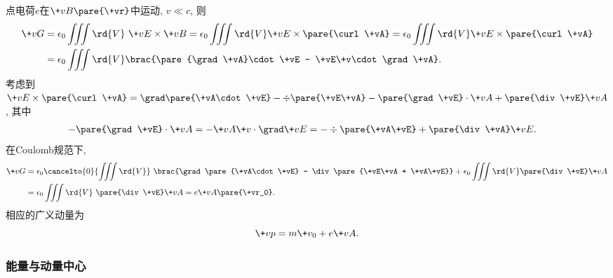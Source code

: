 \documentclass[hidelinks]{ctexart}
\begin{document}
\begin{sample}
    \begin{ex}
        点电荷$e$在$\+vB\pare{\+vr}$中运动, $v \ll c$, 则
        \begin{align*}
            \+vG &= \epsilon_0 \iiint \rd{V}\ \+vE\times \+vB = \epsilon_0 \iiint \rd{V} \+vE\times \pare{\curl \+vA} = \epsilon_0 \iiint \rd{V} \+vE\times \pare{\curl \+vA} \\
            &= \epsilon_0 \iiint \rd{V}\brac{\pare{\grad \+vA}\cdot \+vE - \+vE\+v\cdot \grad \+vA}.
        \end{align*}
        考虑到$\+vE\times \pare{\curl \+vA} = \grad\pare{\+vA\cdot \+vE} - \div\pare{\+vE\+vA} - \pare{\grad \+vE}\cdot \+vA + \pare{\div \+vE}\+vA$, 其中
        \begin{align*}
            -\pare{\grad \+vE}\cdot \+vA &=  -\+vA\+v\cdot \grad \+vE = -\div\pare{\+vA\+vE} + \pare{\div \+vA} \+vE.
        \end{align*}
        在Coulomb规范下,
        \begin{align*}
            \+vG &= \epsilon_0 \cancelto{0}{\iiint \rd{V}}\ \brac{\grad\pare{\+vA\cdot \+vE} - \div\pare{\+vE\+vA + \+vA\+vE}} + \epsilon_0 \iiint \rd{V}\pare{\div \+vE}\+vA\\
            & = \epsilon_0 \iiint \rd{V} \ \pare{\div \+vE} \+vA = e\+vA\pare{\+vr_0}.
        \end{align*}
        相应的广义动量为
        \[ \+vp = m\+v_0 + e\+vA. \]
    \end{ex}
\end{sample}


\subsubsection{能量与动量中心} %
\label{ssub:能量与动量中心}
\end{document}

